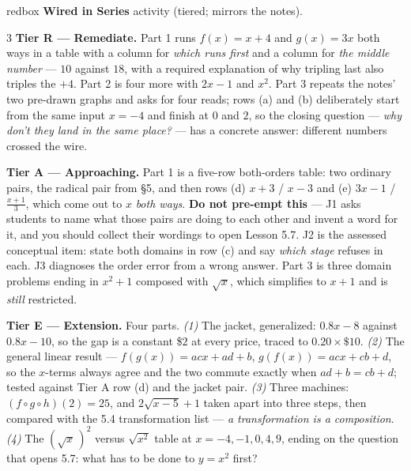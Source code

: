 \documentclass[10pt]{article}
\begin{document}
\begin{skillbox}{redbox}
\textbf{Wired in Series} activity (tiered; mirrors the notes).
\begin{multicols}{3}
\textbf{Tier R --- Remediate.} Part 1 runs $f(x)=x+4$ and $g(x)=3x$ both ways in a table with a
column for \emph{which runs first} and a column for \emph{the middle number} --- $10$ against $18$,
with a required explanation of why tripling last also triples the $+4$. Part 2 is four more with
$2x-1$ and $x^{2}$. Part 3 repeats the notes' two pre-drawn graphs and asks for four reads; rows (a)
and (b) deliberately start from the same input $x=-4$ and finish at $0$ and $2$, so the closing
question --- \emph{why don't they land in the same place?} --- has a concrete answer: different
numbers crossed the wire.

\columnbreak
\textbf{Tier A --- Approaching.} Part 1 is a five-row both-orders table: two ordinary pairs, the
radical pair from \S5, and then rows (d) $x+3$ / $x-3$ and (e) $3x-1$ / $\frac{x+1}{3}$, which come
out to $x$ \emph{both ways}. \textbf{Do not pre-empt this} --- J1 asks students to name what those
pairs are doing to each other and invent a word for it, and you should collect their wordings to
open Lesson 5.7. J2 is the assessed conceptual item: state both domains in row (c) and say
\emph{which stage} refuses in each. J3 diagnoses the order error from a wrong answer. Part 3 is
three domain problems ending in $x^{2}+1$ composed with $\sqrt{x}$, which simplifies to $x+1$ and is
\emph{still} restricted.

\columnbreak
\textbf{Tier E --- Extension.} Four parts. \emph{(1)} The jacket, generalized: $0.8x-8$ against
$0.8x-10$, so the gap is a constant \$$2$ at every price, traced to $0.20\times\$10$. \emph{(2)} The
general linear result --- $f(g(x))=acx+ad+b$, $g(f(x))=acx+cb+d$, so the $x$-terms always agree and
the two commute exactly when $ad+b=cb+d$; tested against Tier A row (d) and the jacket pair.
\emph{(3)} Three machines: $(f\circ g\circ h)(2)=25$, and $2\sqrt{x-5}+1$ taken apart into three
steps, then compared with the 5.4 transformation list --- \emph{a transformation is a composition}.
\emph{(4)} The $\left(\sqrt{x}\,\right)^{2}$ versus $\sqrt{x^{2}}$ table at $x=-4,-1,0,4,9$, ending
on the question that opens 5.7: what has to be done to $y=x^{2}$ first?
\end{multicols}
\end{skillbox}
\end{document}
